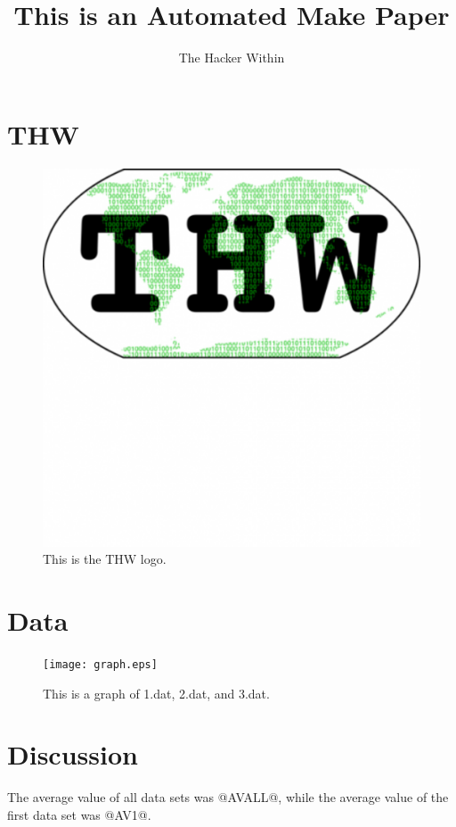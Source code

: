 \documentclass[letterpaper]{article}
\author{The Hacker Within}
\date{}
\title{This is an Automated Make Paper}
\begin{document}
\maketitle
\section{THW}
\begin{figure}[htb!]
  \begin{center}
    \includegraphics{thw_icon.eps}
  \end{center}
  \caption{This is the THW logo. }
  \label{fig:thw_logo}
\end{figure}

\section{Data}
\begin{figure}[htb!]
  \begin{center}
    \texttt{[image: graph.eps]}
  \end{center}
  \caption{This is a graph of 1.dat, 2.dat, and 3.dat. }
  \label{fig:graph}
\end{figure}

\section{Discussion}

The average value of all data sets was @AVALL@, while the average value of the 
first data set was @AV1@.
\end{document}
